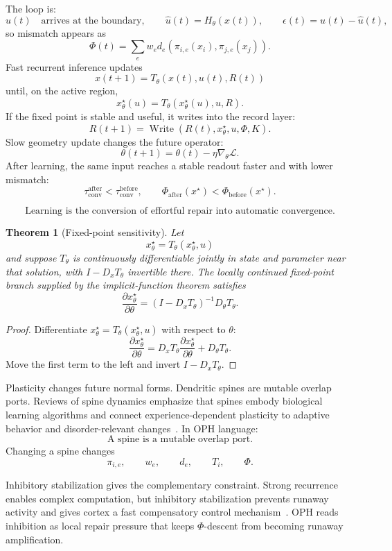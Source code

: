 \documentclass[11pt]{article}
\newtheorem{theorem}{Theorem}[section]
\theoremstyle{remark}
\theoremstyle{plain}
\begin{document}
The loop is:
\[
u(t)\quad\text{arrives at the boundary},
\qquad
\hat u(t)=H_\theta(x(t)),
\qquad
\epsilon(t)=u(t)-\hat u(t),
\]
so mismatch appears as
\[
\Phi(t)=
\sum_e w_e d_e(\pi_{i,e}(x_i),\pi_{j,e}(x_j)).
\]
Fast recurrent inference updates
\[
x(t+1)=T_\theta(x(t),u(t),R(t))
\]
until, on the active region,
\[
x^\star_\theta(u)=T_\theta(x^\star_\theta(u),u,R).
\]
If the fixed point is stable and useful, it writes into the record layer:
\[
R(t+1)=\operatorname{Write}(R(t),x^\star_\theta,u,\Phi,K).
\]
Slow geometry update changes the future operator:
\[
\theta(t+1)=\theta(t)-\eta\nabla_\theta\mathcal L.
\]
After learning, the same input reaches a stable readout faster and with lower mismatch:
\[
\tau_{\mathrm{conv}}^{\mathrm{after}}<
\tau_{\mathrm{conv}}^{\mathrm{before}},
\qquad
\Phi_{\mathrm{after}}(x^\star)<
\Phi_{\mathrm{before}}(x^\star).
\]

\[
\boxed{
\text{Learning is the conversion of effortful repair into automatic convergence.}
}
\]

\begin{theorem}[Fixed-point sensitivity]
Let
\[
x^\star_\theta=T_\theta(x^\star_\theta,u)
\]
and suppose \(T_\theta\) is continuously differentiable jointly in state and parameter near that solution, with \(I-D_xT_\theta\) invertible there. The locally continued fixed-point branch supplied by the implicit-function theorem satisfies
\[
\boxed{
\frac{\partial x^\star_\theta}{\partial\theta}
=
(I-D_xT_\theta)^{-1}D_\theta T_\theta.
}
\]
\end{theorem}

\begin{proof}
Differentiate \(x^\star_\theta=T_\theta(x^\star_\theta,u)\) with respect to \(\theta\):
\[
\frac{\partial x^\star_\theta}{\partial\theta}
=
D_xT_\theta\frac{\partial x^\star_\theta}{\partial\theta}
+
D_\theta T_\theta.
\]
Move the first term to the left and invert \(I-D_xT_\theta\).
\end{proof}

Plasticity changes future normal forms. Dendritic spines are mutable overlap ports. Reviews of spine dynamics emphasize that spines embody biological learning algorithms and connect experience-dependent plasticity to adaptive behavior and disorder-relevant changes~\cite{Kasai2021}. In OPH language:
\[
\boxed{
\text{A spine is a mutable overlap port.}
}
\]
Changing a spine changes
\[
\pi_{i,e},\qquad w_e,\qquad d_e,\qquad T_i,\qquad \Phi.
\]

Inhibitory stabilization gives the complementary constraint. Strong recurrence enables complex computation, but inhibitory stabilization prevents runaway activity and gives cortex a fast compensatory control mechanism~\cite{SadehClopath2021}. OPH reads inhibition as local repair pressure that keeps \(\Phi\)-descent from becoming runaway amplification.
\end{document}
